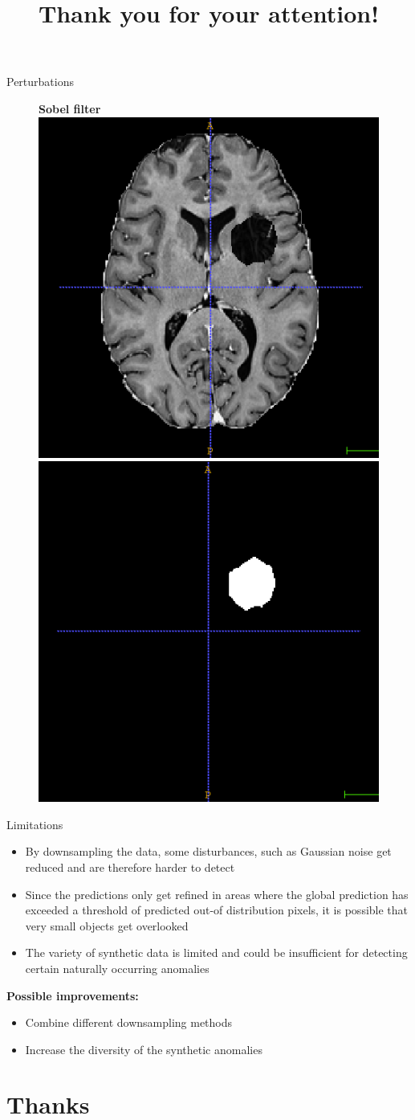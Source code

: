 \documentclass[10pt,aspectratio=169]{beamer}
\begin{document}
\begin{frame}{Perturbations}
\begin{minipage}{.45\columnwidth}
\begin{center}
		\begin{figure}
			\textbf{Sobel filter}\\[.2em]
			\includegraphics[width=.43\columnwidth]{_figs/sobel.png}\hfil
			\includegraphics[width=.43\columnwidth]{_figs/sobelm.png}
		\end{figure}
	\end{center}
\end{minipage}
\end{frame}

\begin{frame}{Limitations}
	\begin{itemize}
		\item By downsampling the data, some disturbances, such as Gaussian noise get reduced and are therefore harder to detect
		\item Since the predictions only get refined in areas where the global prediction has exceeded a threshold of predicted out-of distribution pixels, it is possible that very small objects get overlooked
		\item The variety of synthetic data is limited and could be insufficient for detecting certain naturally occurring anomalies
	\end{itemize} \pause \vspace{1.5em}
	
	{\Large\textbf{Possible improvements: }}\pause \vspace{1em}
	\begin{itemize}
		\item Combine different downsampling methods
		\item Increase the diversity of the synthetic anomalies
	\end{itemize}
	
\end{frame}


\title{Thank you for your attention!}
\subtitle{}
\author{}
\section{Thanks}
\end{document}
